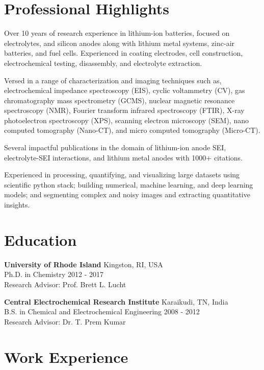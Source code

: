 \documentclass[11pt]{article}
\newcommand{\education}[5]{\noindent \textbf{#1} \hfill #2 \\ #3 \hfill #4 \\ Research Advisor: #5}
\newcommand{\skill}[1]{\noindent{$\blacksquare~$} #1}
\begin{document}
\section*{Professional Highlights}

    \skill{Over 10 years of research experience in lithium-ion batteries, focused on electrolytes, and silicon anodes along with lithium metal systems, zinc-air batteries, and fuel cells. Experienced in coating electrodes, cell construction, electrochemical testing, disassembly, and electrolyte extraction.}
    
    \skill{Versed in a range of characterization and imaging techniques such as, electrochemical impedance spectroscopy (EIS), cyclic voltammetry (CV), gas chromatography mass spectrometry (GCMS), nuclear magnetic resonance spectroscopy (NMR), Fourier transform infrared spectroscopy (FTIR), X-ray photoelectron spectroscopy (XPS), scanning electron microscopy (SEM), nano computed tomography (Nano-CT), and micro computed tomography (Micro-CT).}
    
    \skill{Several impactful publications in the domain of lithium-ion anode SEI, electrolyte-SEI interactions, and lithium metal anodes with 1000+ citations.}
    
    \skill{Experienced in processing, quantifying, and visualizing large datasets using scientific python stack; building numerical, machine learning, and deep learning models; and segmenting complex and noisy images and extracting quantitative insights.}

\section*{Education}

\education
    {University of Rhode Island}
    {Kingston, RI, USA}
    {Ph.D. in Chemistry}
    {2012 - 2017}
    {Prof. Brett L. Lucht}

\education
    {Central Electrochemical Research Institute}
    {Karaikudi, TN, India}
    {B.S. in Chemical and Electrochemical Engineering}
    {2008 - 2012}
    {Dr. T. Prem Kumar}

\section*{Work Experience}
\end{document}
